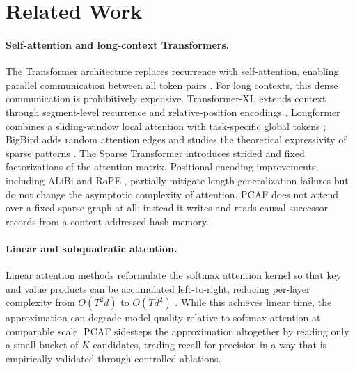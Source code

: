 \documentclass{article}
\begin{document}
\section{Related Work}

\paragraph{Self-attention and long-context Transformers.}
The Transformer architecture replaces recurrence with self-attention, enabling
parallel communication between all token pairs
\citep{vaswani2017attention}. For long contexts, this dense communication is
prohibitively expensive. Transformer-XL extends context through segment-level
recurrence and relative-position encodings \citep{dai2019transformerxl}.
Longformer combines a sliding-window local attention with task-specific global
tokens \citep{beltagy2020longformer}; BigBird adds random attention edges and
studies the theoretical expressivity of sparse patterns
\citep{zaheer2020bigbird}. The Sparse Transformer \citep{child2019sparsetransformer}
introduces strided and fixed factorizations of the attention matrix. Positional
encoding improvements, including ALiBi \citep{press2021alibi} and RoPE
\citep{su2021roformer}, partially mitigate length-generalization failures but do
not change the asymptotic complexity of attention. PCAF does not attend over a
fixed sparse graph at all; instead it writes and reads causal successor records
from a content-addressed hash memory.

\paragraph{Linear and subquadratic attention.}
Linear attention methods reformulate the softmax attention kernel so that key
and value products can be accumulated left-to-right, reducing per-layer
complexity from $O(T^2 d)$ to $O(T d^2)$
\citep{katharopoulos2020linearattn}. While this achieves linear time, the
approximation can degrade model quality relative to softmax attention at
comparable scale. PCAF sidesteps the approximation altogether by reading only a
small bucket of $K$ candidates, trading recall for precision in a way that is
empirically validated through controlled ablations.
\end{document}
